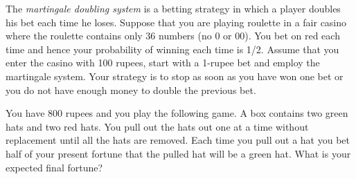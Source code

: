 \documentclass[solution,addpoints,12pt]{exam}
\begin{document}
\begin{questions}

\question The \textit{martingale doubling system} is a betting strategy in which a player doubles his bet each time he loses. Suppose that you are playing roulette in
a fair casino where the roulette contains only 36 numbers (no 0 or 00). You bet on red each time and hence your probability of winning each time is 1/2. Assume that you enter the casino with
100 rupees, start with a 1-rupee bet and employ the martingale system. Your strategy is to
stop as soon as you have won one bet or you do not have enough money to double the previous bet. 


\question[1] You have 800 rupees and you play the following game. A box contains two green
hats and two red hats. You pull out the hats out one at a time without replacement until all the hats are removed. Each time you pull out a hat you bet half of your present fortune that the pulled hat will be a green hat. What is your expected final fortune?
\begin{solution}
\end{solution}


\end{questions}
\end{document}

